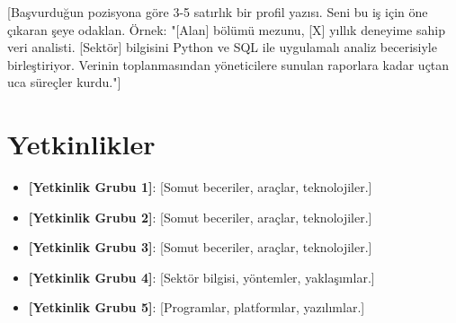 \documentclass[11pt,a4paper,sans]{moderncv}
\begin{document}
\makecvtitle


\vspace{6pt}
\small{[Başvurduğun pozisyona göre 3-5 satırlık bir profil yazısı. Seni bu iş için öne çıkaran şeye odaklan. Örnek: "[Alan] bölümü mezunu, [X] yıllık deneyime sahip veri analisti. [Sektör] bilgisini Python ve SQL ile uygulamalı analiz becerisiyle birleştiriyor. Verinin toplanmasından yöneticilere sunulan raporlara kadar uçtan uca süreçler kurdu."]}


\section{Yetkinlikler}
\vspace{1pt}
\begin{itemize}

\item \textbf{[Yetkinlik Grubu 1]}: [Somut beceriler, araçlar, teknolojiler.]

\item \textbf{[Yetkinlik Grubu 2]}: [Somut beceriler, araçlar, teknolojiler.]

\item \textbf{[Yetkinlik Grubu 3]}: [Somut beceriler, araçlar, teknolojiler.]

\item \textbf{[Yetkinlik Grubu 4]}: [Sektör bilgisi, yöntemler, yaklaşımlar.]

\item \textbf{[Yetkinlik Grubu 5]}: [Programlar, platformlar, yazılımlar.]

\end{itemize}

\end{document}
